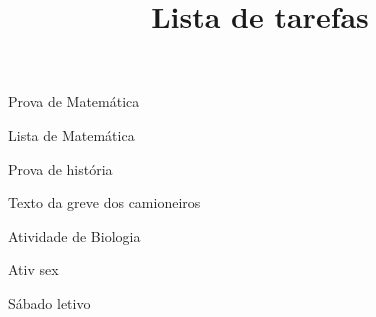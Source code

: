 \title{Lista de tarefas}





\begin{checklist}
  \item{Prova de Matemática}
  \item{Lista de Matemática}
  \item{Prova de história}
  \item{Texto da greve dos camioneiros}
  \item{Atividade de Biologia}
  \item{Ativ sex}
  \item{Sábado letivo}
\end{checklist}


